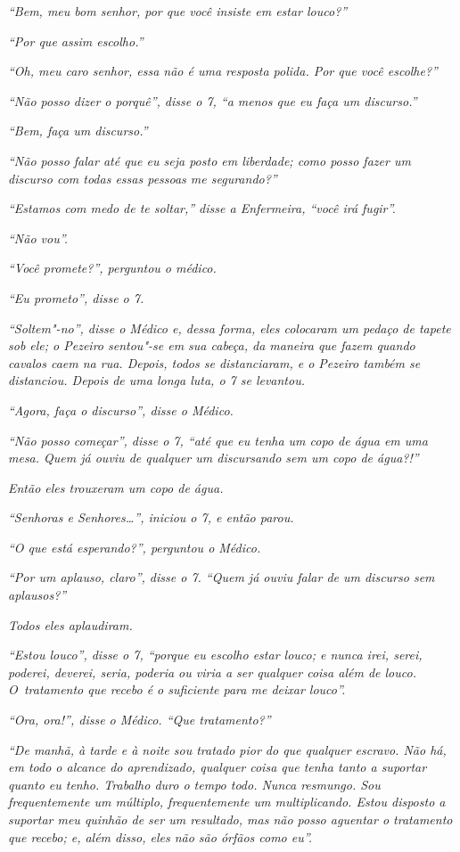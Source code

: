 \emph{``Bem, meu bom senhor, por que você insiste em estar louco?''}

\emph{``Por que assim escolho.''}

\emph{``Oh, meu caro senhor, essa não é uma resposta polida. Por que
você escolhe?''}

\emph{``Não posso dizer o porquê'', disse o 7, ``a menos que eu faça um
discurso.''}

\emph{``Bem, faça um discurso.''}

\emph{``Não posso falar até que eu seja posto em liberdade; como posso
fazer um discurso com todas essas pessoas me segurando?''}

\emph{``Estamos com medo de te soltar,'' disse a Enfermeira, ``você irá
fugir''.}

\emph{``Não vou''.}

\emph{``Você promete?'', perguntou o médico.}

\emph{``Eu prometo'', disse o 7.}

\emph{``Soltem"-no'', disse o Médico e, dessa forma, eles colocaram um
pedaço de tapete sob ele; o Pezeiro sentou"-se em sua cabeça, da maneira
que fazem quando cavalos caem na rua. Depois, todos se distanciaram, e o
Pezeiro também se distanciou. Depois de uma longa luta, o 7 se
levantou.}

\emph{``Agora, faça o discurso'', disse o Médico.}

\emph{``Não posso começar'', disse o 7, ``até que eu tenha um copo de
água em uma mesa. Quem já ouviu de qualquer um discursando sem um copo
de água?!''}

\emph{Então eles trouxeram um copo de água.}

\emph{``Senhoras e Senhores…'', iniciou o 7, e então parou.}

\emph{``O que está esperando?'', perguntou o Médico.}

\emph{``Por um aplauso, claro'', disse o 7. ``Quem já ouviu falar de um
discurso sem aplausos?''}

\emph{Todos eles aplaudiram.}

\emph{``Estou louco'', disse o 7, ``porque eu escolho estar louco; e
nunca irei, serei, poderei, deverei, seria, poderia ou viria a ser
qualquer coisa além de louco. O~tratamento que recebo é o suficiente
para me deixar louco''.}

\emph{``Ora, ora!'', disse o Médico. ``Que tratamento?''}

\emph{``De manhã, à tarde e à noite sou tratado pior do que qualquer
escravo. Não há, em todo o alcance do aprendizado, qualquer coisa que
tenha tanto a suportar quanto eu tenho. Trabalho duro o tempo todo.
Nunca resmungo. Sou frequentemente um múltiplo, frequentemente um
multiplicando. Estou disposto a suportar meu quinhão de ser um
resultado, mas não posso aguentar o tratamento que recebo; e, além
disso, eles não são órfãos como eu''.}


